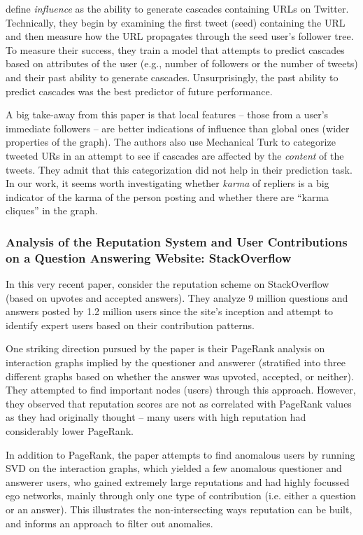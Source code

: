 \documentclass[10pt]{article}
\begin{document}
\citet{bakshy2011everyone} define \textit{influence} as the ability to generate
cascades containing URLs on Twitter. Technically, they begin by examining the
first tweet (seed) containing the URL and then measure how the URL propagates
through the seed user's follower tree. To measure their success, they train a
model that attempts to predict cascades based on attributes of the user (e.g.,
number of followers or the number of tweets) and their past ability to generate
cascades.  Unsurprisingly, the past ability to predict cascades was the best
predictor of future performance.

A big take-away from this paper is that local features -- those from a user's
immediate followers -- are better indications of influence than global ones
(wider properties of the graph). The authors also use Mechanical Turk to
categorize tweeted URs in an attempt to see if cascades are affected by the
\textit{content} of the tweets. They admit that this categorization did not help
in their prediction task. In our work, it seems worth investigating whether
\textit{karma} of repliers is a big indicator of the karma of the person posting
and whether there are ``karma cliques'' in the graph.

\subsubsection{Analysis of the Reputation System and User Contributions on a
  Question Answering Website: StackOverflow
  \citep{movshovitzanalysis}}

In this very recent paper, \citet{movshovitzanalysis} consider the reputation
scheme on StackOverflow (based on upvotes and accepted answers). They analyze 9
million questions and answers posted by 1.2 million users since the site's
inception and attempt to identify expert users based on their contribution
patterns.

One striking direction pursued by the paper is their PageRank analysis on
interaction graphs implied by the questioner and answerer (stratified into three
different graphs based on whether the answer was upvoted, accepted, or neither).
They attempted to find important nodes (users) through this approach. However,
they observed that reputation scores are not as correlated with PageRank values
as they had originally thought -- many users with high reputation had
considerably lower PageRank.

In addition to PageRank, the paper attempts to find anomalous users by running
SVD on the interaction graphs, which yielded a few anomalous questioner and
answerer users, who gained extremely large reputations and had highly focussed
ego networks, mainly through only one type of contribution (i.e. either a
question or an answer). This illustrates the non-intersecting ways reputation
can be built, and informs an approach to filter out anomalies.
\end{document}
